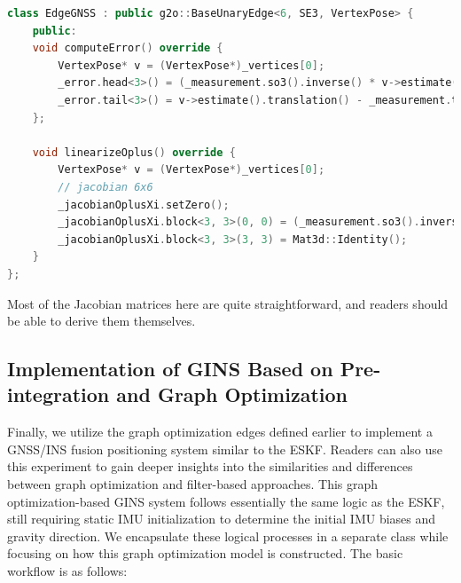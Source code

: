 \begin{lstlisting}[language=c++,caption=src/common/g2o\_types.h]
class EdgeGNSS : public g2o::BaseUnaryEdge<6, SE3, VertexPose> {
	public:
	void computeError() override {
		VertexPose* v = (VertexPose*)_vertices[0];
		_error.head<3>() = (_measurement.so3().inverse() * v->estimate().so3()).log();
		_error.tail<3>() = v->estimate().translation() - _measurement.translation();
	};
	
	void linearizeOplus() override {
		VertexPose* v = (VertexPose*)_vertices[0];
		// jacobian 6x6
		_jacobianOplusXi.setZero();
		_jacobianOplusXi.block<3, 3>(0, 0) = (_measurement.so3().inverse() * v->estimate().so3()).jr_inv();  // dR/dR
		_jacobianOplusXi.block<3, 3>(3, 3) = Mat3d::Identity();                        
	}
};
\end{lstlisting}

Most of the Jacobian matrices here are quite straightforward, and readers should be able to derive them themselves.

\subsection{Implementation of GINS Based on Pre-integration and Graph Optimization}

Finally, we utilize the graph optimization edges defined earlier to implement a GNSS/INS fusion positioning system similar to the ESKF. Readers can also use this experiment to gain deeper insights into the similarities and differences between graph optimization and filter-based approaches. This graph optimization-based GINS system follows essentially the same logic as the ESKF, still requiring static IMU initialization to determine the initial IMU biases and gravity direction. We encapsulate these logical processes in a separate class while focusing on how this graph optimization model is constructed. The basic workflow is as follows:

